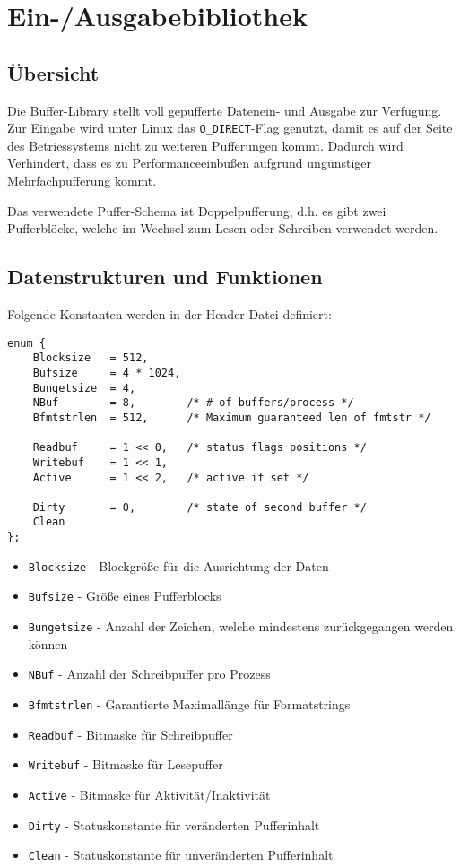\chapter{Ein-/Ausgabebibliothek}
\label{chap:buffer}

\section{Übersicht}
\label{sec:buffer_overview}

Die Buffer-Library stellt voll gepufferte Datenein-
und Ausgabe zur Verfügung.
Zur Eingabe wird unter Linux das \texttt{O\_DIRECT}-Flag genutzt,
damit es auf der Seite des Betriessystems nicht zu weiteren Pufferungen kommt.
Dadurch wird Verhindert,
dass es zu Performanceeinbußen aufgrund ungünstiger Mehrfachpufferung kommt.

Das verwendete Puffer-Schema ist Doppelpufferung,
d.h. es gibt zwei Pufferblöcke,
welche im Wechsel zum Lesen oder Schreiben verwendet werden.

\section{Datenstrukturen und Funktionen}
\label{sec:buf_datafunc}

Folgende Konstanten werden in der Header-Datei definiert:

\begin{lstlisting}
enum {
	Blocksize	= 512,
	Bufsize		= 4 * 1024,
	Bungetsize	= 4,
	NBuf		= 8,		/* # of buffers/process */
	Bfmtstrlen	= 512,		/* Maximum guaranteed len of fmtstr */

	Readbuf		= 1 << 0,	/* status flags positions */
	Writebuf	= 1 << 1,
	Active		= 1 << 2,	/* active if set */

	Dirty		= 0,		/* state of second buffer */
	Clean
};
\end{lstlisting}

\begin{itemize}
\item \texttt{Blocksize} - Blockgröße für die Ausrichtung der Daten
\item \texttt{Bufsize} - Größe eines Pufferblocks
\item \texttt{Bungetsize} - Anzahl der Zeichen, welche mindestens zurückgegangen werden können
\item \texttt{NBuf} - Anzahl der Schreibpuffer pro Prozess
\item \texttt{Bfmtstrlen} - Garantierte Maximallänge für Formatstrings
\item \texttt{Readbuf} - Bitmaske für Schreibpuffer
\item \texttt{Writebuf} - Bitmaske für Lesepuffer
\item \texttt{Active} - Bitmaske für Aktivität/Inaktivität
\item \texttt{Dirty} - Statuskonstante für veränderten Pufferinhalt
\item \texttt{Clean} - Statuskonstante für unveränderten Pufferinhalt
\end{itemize}

